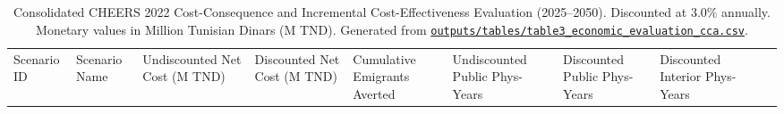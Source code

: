 \documentclass[
  11pt,
  a4paper]{article}
\begin{document}
\begin{longtable}[]{@{}
  >{\raggedright\arraybackslash}p{}
  >{\raggedright\arraybackslash}p{}
  >{\centering\arraybackslash}p{}
  >{\centering\arraybackslash}p{}
  >{\centering\arraybackslash}p{}
  >{\centering\arraybackslash}p{}
  >{\centering\arraybackslash}p{}
  >{\centering\arraybackslash}p{}
  >{\centering\arraybackslash}p{}
  >{\centering\arraybackslash}p{}@{}}
\caption{Consolidated CHEERS 2022 Cost-Consequence and Incremental
Cost-Effectiveness Evaluation (2025--2050). Discounted at 3.0\%
annually. Monetary values in Million Tunisian Dinars (M TND). Generated
from
\href{file:///c:/Users/drfir/Documents/physician-exodus-tunisia/outputs/tables/table3_economic_evaluation_cca.csv}{\protect\texttt{outputs/tables/table3\_economic\_evaluation\_cca.csv}}.}\label{tbl-icer}\tabularnewline
\toprule\noalign{}
\begin{minipage}[b]{\linewidth}\raggedright
Scenario ID
\end{minipage} & \begin{minipage}[b]{\linewidth}\raggedright
Scenario Name
\end{minipage} & \begin{minipage}[b]{\linewidth}\centering
Undiscounted Net Cost (M TND)
\end{minipage} & \begin{minipage}[b]{\linewidth}\centering
Discounted Net Cost (M TND)
\end{minipage} & \begin{minipage}[b]{\linewidth}\centering
Cumulative Emigrants Averted
\end{minipage} & \begin{minipage}[b]{\linewidth}\centering
Undiscounted Public Phys-Years
\end{minipage} & \begin{minipage}[b]{\linewidth}\centering
Discounted Public Phys-Years
\end{minipage} & \begin{minipage}[b]{\linewidth}\centering
Discounted Interior Phys-Years
\end{minipage} & \begin{minipage}[b]{\linewidth}\centering

\end{minipage}
\end{longtable}
\end{document}

